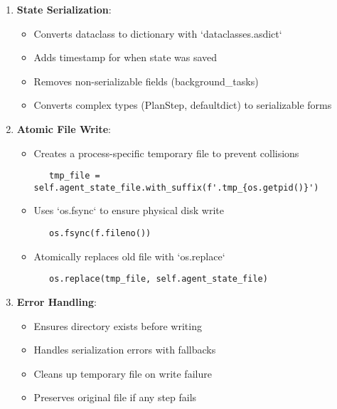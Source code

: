 \documentclass[12pt,a4paper]{article}
\begin{document}
\begin{enumerate}[label=\arabic*.]
    \item \textbf{State Serialization}:
    \begin{itemize}
        \item Converts dataclass to dictionary with `dataclasses.asdict`
        \item Adds timestamp for when state was saved
        \item Removes non-serializable fields (background\_tasks)
        \item Converts complex types (PlanStep, defaultdict) to serializable forms
    \end{itemize}
    \item \textbf{Atomic File Write}:
    \begin{itemize}
        \item Creates a process-specific temporary file to prevent collisions
        \begin{pageablecode}
        \begin{verbatim}
   tmp_file = self.agent_state_file.with_suffix(f'.tmp_{os.getpid()}')
        \end{verbatim}
        \end{pageablecode}
        \item Uses `os.fsync` to ensure physical disk write
        \begin{pageablecode}
        \begin{verbatim}
   os.fsync(f.fileno())
        \end{verbatim}
        \end{pageablecode}
        \item Atomically replaces old file with `os.replace`
        \begin{pageablecode}
        \begin{verbatim}
   os.replace(tmp_file, self.agent_state_file)
        \end{verbatim}
        \end{pageablecode}
    \end{itemize}
    \item \textbf{Error Handling}:
    \begin{itemize}
        \item Ensures directory exists before writing
        \item Handles serialization errors with fallbacks
        \item Cleans up temporary file on write failure
        \item Preserves original file if any step fails
    \end{itemize}
\end{enumerate}
\end{document}
